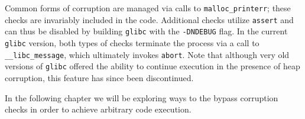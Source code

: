 \documentclass{article}
\begin{document}
Common forms of corruption are managed via calls to \texttt{malloc\_printerr};
these checks are invariably included in the code. Additional checks utilize
\texttt{assert} and can thus be disabled by building \texttt{glibc} with the
\texttt{-DNDEBUG} flag. In the current \texttt{glibc} version, both types of
checks terminate the process via a call to \texttt{\_\_libc\_message}, which
ultimately invokes \texttt{abort}. Note that although very old versions of
\texttt{glibc} offered the ability to continue execution in the presence of heap
corruption, this feature has since been discontinued.

In the following chapter we will be exploring ways to the bypass corruption checks
in order to achieve arbitrary code execution.


\end{document}
